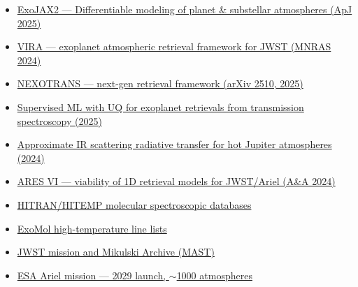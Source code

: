 \documentclass[11pt,a4paper]{article}
\begin{document}
\begin{itemize}[leftmargin=1.2em]
  \item \href{https://iopscience.iop.org/article/10.3847/1538-4357/adcba2}{ExoJAX2 --- Differentiable modeling of planet \& substellar atmospheres (ApJ 2025)}
  \item \href{https://academic.oup.com/mnras/article/530/3/3252/7659843}{VIRA --- exoplanet atmospheric retrieval framework for JWST (MNRAS 2024)}
  \item \href{https://arxiv.org/html/2510.27223}{NEXOTRANS --- next-gen retrieval framework (arXiv 2510, 2025)}
  \item \href{https://arxiv.org/html/2508.04982}{Supervised ML with UQ for exoplanet retrievals from transmission spectroscopy (2025)}
  \item \href{https://arxiv.org/html/2402.17697}{Approximate IR scattering radiative transfer for hot Jupiter atmospheres (2024)}
  \item \href{https://www.aanda.org/articles/aa/full_html/2024/04/aa47379-23/aa47379-23.html}{ARES VI --- viability of 1D retrieval models for JWST/Ariel (A\&A 2024)}
  \item \href{https://hitran.org/}{HITRAN/HITEMP molecular spectroscopic databases}
  \item \href{https://www.exomol.com/}{ExoMol high-temperature line lists}
  \item \href{https://www.jwst.nasa.gov/}{JWST mission and Mikulski Archive (MAST)}
  \item \href{https://arielmission.space/}{ESA Ariel mission --- 2029 launch, $\sim$1000 atmospheres}
\end{itemize}
\end{document}
